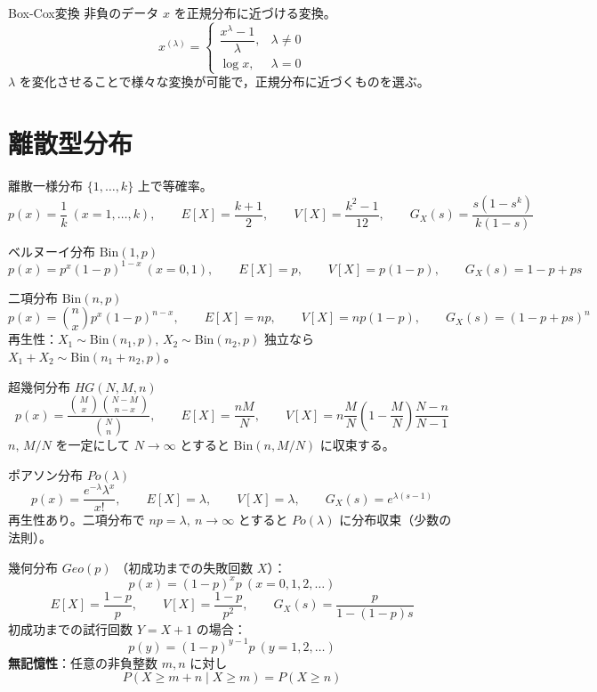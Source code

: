 \documentclass[a4paper,11pt]{ltjsarticle}
\begin{document}
\begin{term}{Box-Cox変換}
非負のデータ $x$ を正規分布に近づける変換。
\[
x^{(\lambda)} =
\begin{cases}
\dfrac{x^{\lambda}-1}{\lambda}, & \lambda \ne 0\\[4pt]
\log x, & \lambda = 0
\end{cases}
\]
$\lambda$ を変化させることで様々な変換が可能で，正規分布に近づくものを選ぶ。
\end{term}

\section{離散型分布}

\begin{term}{離散一様分布}
$\{1,\dots,k\}$ 上で等確率。
\[
p(x)=\frac{1}{k}\ (x=1,\dots,k),\qquad
E[X]=\frac{k+1}{2},\qquad
V[X]=\frac{k^2-1}{12},\qquad
G_X(s)=\frac{s(1-s^k)}{k(1-s)}
\]
\end{term}

\begin{term}{ベルヌーイ分布 $\mathrm{Bin}(1,p)$}
\[
p(x)=p^x(1-p)^{1-x}\ (x=0,1),\qquad E[X]=p,\qquad V[X]=p(1-p),\qquad G_X(s)=1-p+ps
\]
\end{term}

\begin{term}{二項分布 $\mathrm{Bin}(n,p)$}
\[
p(x)=\binom{n}{x}p^x(1-p)^{n-x},\qquad
E[X]=np,\qquad V[X]=np(1-p),\qquad G_X(s)=(1-p+ps)^n
\]
再生性：$X_1\sim\mathrm{Bin}(n_1,p),\,X_2\sim\mathrm{Bin}(n_2,p)$ 独立なら $X_1+X_2\sim\mathrm{Bin}(n_1+n_2,p)$。
\end{term}

\begin{term}{超幾何分布 $HG(N,M,n)$}
\[
p(x)=\frac{\binom{M}{x}\binom{N-M}{n-x}}{\binom{N}{n}},\qquad
E[X]=\frac{nM}{N},\qquad
V[X]=n\frac{M}{N}\left(1-\frac{M}{N}\right)\frac{N-n}{N-1}
\]
$n,\,M/N$ を一定にして $N\to\infty$ とすると $\mathrm{Bin}(n,M/N)$ に収束する。
\end{term}

\begin{term}{ポアソン分布 $Po(\lambda)$}
\[
p(x)=\frac{e^{-\lambda}\lambda^x}{x!},\qquad
E[X]=\lambda,\qquad V[X]=\lambda,\qquad G_X(s)=e^{\lambda(s-1)}
\]
再生性あり。二項分布で $np=\lambda,\ n\to\infty$ とすると $Po(\lambda)$ に分布収束（少数の法則）。
\end{term}

\begin{term}{幾何分布 $Geo(p)$}
（初成功までの失敗回数 $X$）：
\[
p(x)=(1-p)^x p\ (x=0,1,2,\dots)
\]
\[
E[X]=\frac{1-p}{p},\qquad V[X]=\frac{1-p}{p^2},\qquad G_X(s)=\frac{p}{1-(1-p)s}
\]
初成功までの試行回数 $Y=X+1$ の場合：
\[
p(y)=(1-p)^{y-1}p\ (y=1,2,\dots)
\]
\textbf{無記憶性}：任意の非負整数 $m,n$ に対し
\[
P(X\ge m+n \mid X\ge m) = P(X\ge n)
\]
\end{term}
\end{document}
